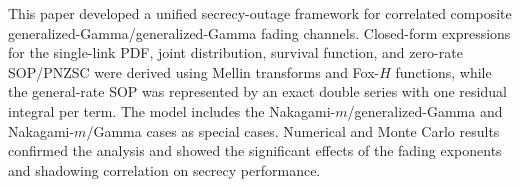 \documentclass[lettersize,journal]{IEEEtran}
\begin{document}
This paper developed a unified secrecy-outage framework for correlated composite generalized-Gamma/generalized-Gamma fading channels. Closed-form expressions for the single-link PDF, joint distribution, survival function, and zero-rate SOP/PNZSC were derived using Mellin transforms and Fox-$H$ functions, while the general-rate SOP was represented by an exact double series with one residual integral per term. The model includes the Nakagami-$m$/generalized-Gamma and Nakagami-$m$/Gamma cases as special cases. Numerical and Monte Carlo results confirmed the analysis and showed the significant effects of the fading exponents and shadowing correlation on secrecy performance.





\end{document}
